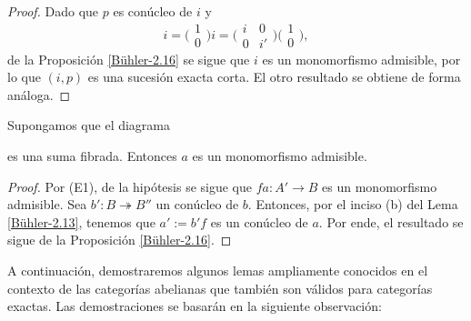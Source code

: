 \documentclass[tesis]{subfiles}
\begin{document}
\begin{proof}
    Dado que $p$ es conúcleo de $i$ y
    \[
        i = \big(\begin{smallmatrix} 1 \\ 0 \end{smallmatrix}\big)i = \big(\begin{smallmatrix} i &0 \\ 0 &i' \end{smallmatrix}\big) \big(\begin{smallmatrix} 1 \\ 0 \end{smallmatrix}\big),
    \] 
    de la Proposición \ref{Bühler-2.16} se sigue que $i$ es un monomorfismo admisible, por lo que $(i,p)$ es una sucesión exacta corta. El otro resultado se obtiene de forma análoga.
\end{proof}

\begin{Coro}\label{Bühler-2.19}
    Supongamos que el diagrama
    \begin{center}
    \end{center}
    es una suma fibrada. Entonces $a$ es un monomorfismo admisible.
\end{Coro}

\begin{proof}
    Por (E1), de la hipótesis se sigue que $fa:A'\to B$ es un monomorfismo admisible. Sea $b':B\twoheadrightarrow B''$ un conúcleo de $b$. Entonces, por el inciso (b) del Lema \ref{Bühler-2.13}, tenemos que $a':=b'f$ es un conúcleo de $a$. Por ende, el resultado se sigue de la Proposición \ref{Bühler-2.16}. 
\end{proof}


A continuación, demostraremos algunos lemas ampliamente conocidos en el contexto de las categorías abelianas que también son válidos para categorías exactas. Las demostraciones se basarán en la siguiente observación:
\end{document}
